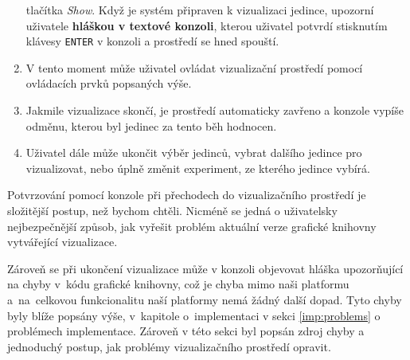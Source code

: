 \begin{enumerate}
        tlačítka \emph{Show}. Když je systém připraven k vizualizaci jedince,
        upozorní uživatele \textbf{hláškou v textové konzoli}, kterou uživatel
        potvrdí stisknutím klávesy \texttt{ENTER} v konzoli a prostředí se hned
        spouští.
    \item V tento moment může uživatel ovládat vizualizační prostředí pomocí
        ovládacích prvků popsaných výše.
    \item Jakmile vizualizace skončí, je prostředí automaticky zavřeno a
        konzole vypíše odměnu, kterou byl jedinec za tento běh hodnocen.
    \item Uživatel dále může ukončit výběr jedinců, vybrat dalšího jedince pro
        vizualizovat, nebo úplně změnit experiment, ze kterého jedince vybírá.
\end{enumerate}
Potvrzování pomocí konzole při přechodech do vizualizačního prostředí je
složitější postup, než bychom chtěli. Nicméně se jedná o uživatelsky
nejbezpečnější způsob, jak vyřešit problém aktuální verze grafické knihovny
vytvářející vizualizace. 

Zároveň se při ukončení vizualizace může v konzoli objevovat hláška
upozorňující na chyby v~kódu grafické knihovny, což je chyba mimo naši
platformu a~na~celkovou funkcionalitu naší platformy nemá žádný další dopad.
Tyto chyby byly blíže popsány výše, v~kapitole o~implementaci v sekci
\ref{imp:problems} o problémech implementace. Zároveň v této sekci byl popsán
zdroj chyby a jednoduchý postup, jak problémy vizualizačního prostředí opravit.
